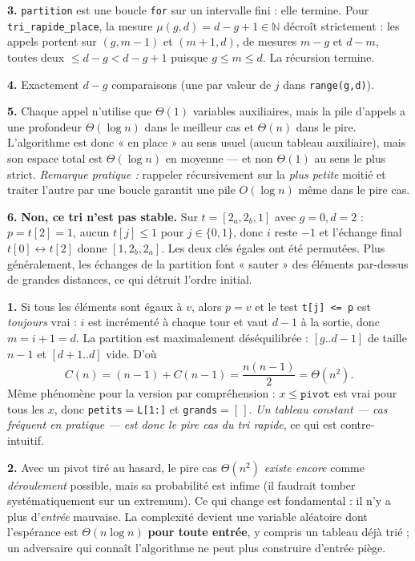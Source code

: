 \documentclass[11pt,a4paper]{article}
\begin{document}
\textbf{3.} \texttt{partition} est une boucle \texttt{for} sur un intervalle fini : elle
termine. Pour \texttt{tri\_rapide\_place}, la mesure $\mu(g,d)=d-g+1\in\mathbb N$
décroît strictement : les appels portent sur $(g,m-1)$ et $(m+1,d)$, de mesures
$m-g$ et $d-m$, toutes deux $\le d-g<d-g+1$ puisque $g\le m\le d$. La récursion termine.

\textbf{4.} Exactement $d-g$ comparaisons (une par valeur de $j$ dans
\texttt{range(g,d)}).

\textbf{5.} Chaque appel n'utilise que $\Theta(1)$ variables auxiliaires, mais la pile
d'appels a une profondeur $\Theta(\log n)$ dans le meilleur cas et $\Theta(n)$ dans le
pire. L'algorithme est donc « en place » au sens usuel (aucun tableau auxiliaire), mais
son espace total est $\Theta(\log n)$ en moyenne --- et non $\Theta(1)$ au sens le plus
strict. \emph{Remarque pratique :} rappeler récursivement sur la \emph{plus petite}
moitié et traiter l'autre par une boucle garantit une pile $O(\log n)$ même dans le pire
cas.

\textbf{6.} \textbf{Non, ce tri n'est pas stable.} Sur $t=[2_a,2_b,1]$ avec $g=0,d=2$ :
$p=t[2]=1$, aucun $t[j]\le1$ pour $j\in\{0,1\}$, donc $i$ reste $-1$ et l'échange final
$t[0]\leftrightarrow t[2]$ donne $[1,2_b,2_a]$. Les deux clés égales ont été permutées.
Plus généralement, les échanges de la partition font « sauter » des éléments par-dessus
de grandes distances, ce qui détruit l'ordre initial.

\reponse
\textbf{1.} Si tous les éléments sont égaux à $v$, alors $p=v$ et le test
\texttt{t[j] <= p} est \emph{toujours} vrai : $i$ est incrémenté à chaque tour et vaut
$d-1$ à la sortie, donc $m=i+1=d$. La partition est maximalement déséquilibrée :
$[g..d-1]$ de taille $n-1$ et $[d+1..d]$ vide. D'où
\[
  C(n)=(n-1)+C(n-1)=\frac{n(n-1)}{2}=\Theta(n^{2}).
\]
Même phénomène pour la version par compréhension : $x\le\texttt{pivot}$ est vrai pour
tous les $x$, donc \texttt{petits}$=$\texttt{L[1:]} et \texttt{grands}$=[\,]$.
\emph{Un tableau constant --- cas fréquent en pratique --- est donc le pire cas du tri
rapide}, ce qui est contre-intuitif.

\textbf{2.} Avec un pivot tiré au hasard, le pire cas $\Theta(n^2)$ \emph{existe encore}
comme \emph{déroulement} possible, mais sa probabilité est infime (il faudrait tomber
systématiquement sur un extremum). Ce qui change est fondamental : il n'y a plus
d'\emph{entrée} mauvaise. La complexité devient une variable aléatoire dont l'espérance
est $\Theta(n\log n)$ \textbf{pour toute entrée}, y compris un tableau déjà trié ; un
adversaire qui connaît l'algorithme ne peut plus construire d'entrée piège.
\end{document}

